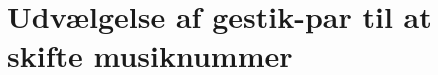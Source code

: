 \section{Udvælgelse af gestik-par til at skifte musiknummer}
\label{TestresultaterSkiftMusiknummer}
%
